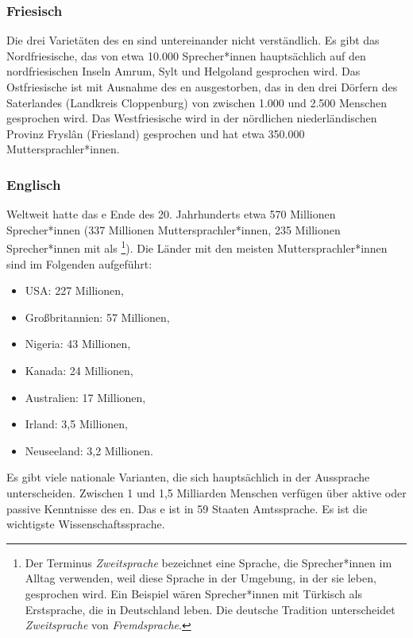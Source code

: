 \subsubsection{Friesisch}

Die drei Varietäten des en sind untereinander nicht verständlich. Es gibt das Nordfriesische, das von
etwa 10.000 Sprecher*innen hauptsächlich auf den nordfriesischen Inseln Amrum, Sylt und Helgoland gesprochen wird. Das Ostfriesische
ist mit Ausnahme des en ausgestorben, das in den drei Dörfern des Saterlandes
(Landkreis Cloppenburg) von zwischen 1.000 und 2.500 Menschen gesprochen wird.
Das Westfriesische wird in der nördlichen niederländischen Provinz Fryslân (Friesland) gesprochen und hat etwa 350.000
Muttersprachler*innen.



\subsubsection{Englisch}

Weltweit hatte das e Ende des 20. Jahrhunderts etwa 570 Millionen Sprecher*innen
(337 Millionen Muttersprachler*innen, 235 Millionen Sprecher*innen mit  als \footnote{%
  Der Terminus \emph{Zweitsprache} bezeichnet eine Sprache, die Sprecher*innen im
  Alltag verwenden, weil diese Sprache in der Umgebung, in der sie leben, gesprochen wird. Ein Beispiel wären Sprecher*innen mit
  Türkisch als Erstsprache, die in Deutschland leben. Die deutsche Tradition unterscheidet
  \emph{Zweitsprache} von \emph{Fremdsprache}.%
}). Die Länder mit den meisten Muttersprachler*innen sind im Folgenden aufgeführt:
\begin{itemize}
\item USA: 227 Millionen,
\item Großbritannien: 57 Millionen,
\item Nigeria: 43 Millionen,
\item Kanada: 24 Millionen,
\item Australien: 17 Millionen,
\item Irland: 3,5 Millionen,
\item Neuseeland: 3,2 Millionen.
\end{itemize}
Es gibt viele nationale Varianten, die sich hauptsächlich in der Aussprache unterscheiden.
Zwischen 1 und 1,5 Milliarden Menschen verfügen über aktive oder passive Kenntnisse des en.
Das e ist in 59 Staaten Amtssprache. Es ist die wichtigste Wissenschaftssprache.%




